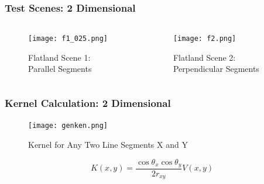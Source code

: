       \begin{frame}\frametitle{Test Scenes: 2 Dimensional}
        \begin{columns}[T]
          \begin{column}{.4\textwidth}
      			\vspace{-5 mm}
                \begin{figure}
              \centering
              \captionsetup{justification=centering}

              \texttt{[image: f1\_025.png]}
              \vspace{-3 mm}
              \caption{Flatland Scene 1: Parallel Segments}
              \label{fig_parallel}
              \end{figure}
                  

          \end{column}
        \begin{column}{.5\textwidth}

                   \begin{figure}
                \centering
              \captionsetup{justification=centering}

                \texttt{[image: f2.png]}
                \vspace{-3 mm}
                \caption{Flatland Scene 2: Perpendicular Segments}
                \label{fig_parallel}
                \end{figure}
        \end{column}
      \end{columns}
    \end{frame} 





    \begin{frame}\frametitle{Kernel Calculation: 2 Dimensional }

          \begin{figure}
          \centering
          \texttt{[image: genken.png]}
          \caption{ Kernel for Any Two Line Segments X and Y}
          \label{fig_gen_kernel_2D}
          \end{figure}

          \vspace{-5 mm}

          \begin{equation} \label{eq:2dkernel}
          K(x,y) =  \frac{\cos \theta_x \cos \theta_y} {2 r_{xy}}V(x,y) 
          \end{equation}

    \end{frame}


